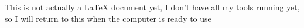 This is not actually a LaTeX document yet, I don't have all my tools running yet, so I will return to this when the computer is ready to use
